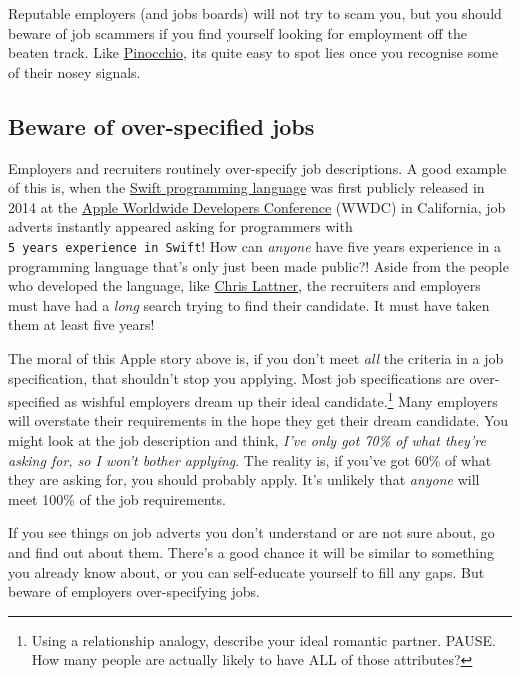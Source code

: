 \documentclass[
]{book}
\begin{document}
Reputable employers (and jobs boards) will not try to scam you, but you should beware of job scammers if you find yourself looking for employment off the beaten track. Like \href{https://en.wikipedia.org/wiki/Pinocchio}{Pinocchio}, its quite easy to spot lies once you recognise some of their nosey signals. 🤥

\hypertarget{overspec}{%
\subsection{Beware of over-specified jobs}\label{overspec}}

Employers and recruiters routinely over-specify job descriptions. A good example of this is, when the \href{https://en.wikipedia.org/wiki/Swift_(programming_language)}{Swift programming language} was first publicly released in 2014 at the \href{https://en.wikipedia.org/wiki/Apple_Worldwide_Developers_Conference}{Apple Worldwide Developers Conference} (WWDC) in California, job adverts instantly appeared asking for programmers with \texttt{5\ years\ experience\ in\ Swift}! How can \emph{anyone} have five years experience in a programming language that's only just been made public?! Aside from the people who developed the language, like \href{https://en.wikipedia.org/wiki/Chris_Lattner}{Chris Lattner}, the recruiters and employers must have had a \emph{long} search trying to find their candidate. It must have taken them at least five years!

The moral of this Apple story above is, if you don't meet \emph{all} the criteria in a job specification, that shouldn't stop you applying. Most job specifications are over-specified as wishful employers dream up their ideal candidate.\footnote{Using a relationship analogy, describe your ideal romantic partner. PAUSE. How many people are actually likely to have ALL of those attributes?} Many employers will overstate their requirements in the hope they get their dream candidate. You might look at the job description and think, \emph{I've only got 70\% of what they're asking for, so I won't bother applying}. The reality is, if you've got 60\% of what they are asking for, you should probably apply. It's unlikely that \emph{anyone} will meet 100\% of the job requirements.

If you see things on job adverts you don't understand or are not sure about, go and find out about them. There's a good chance it will be similar to something you already know about, or you can self-educate yourself to fill any gaps. But beware of employers over-specifying jobs. 🤣
\end{document}

